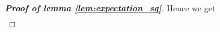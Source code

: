 \begin{proof}[\textbf{Proof of lemma \ref{lem:expectation_sq}}]
	Hence we get 
	\begin{align*}

\end{align*}
\end{proof}
